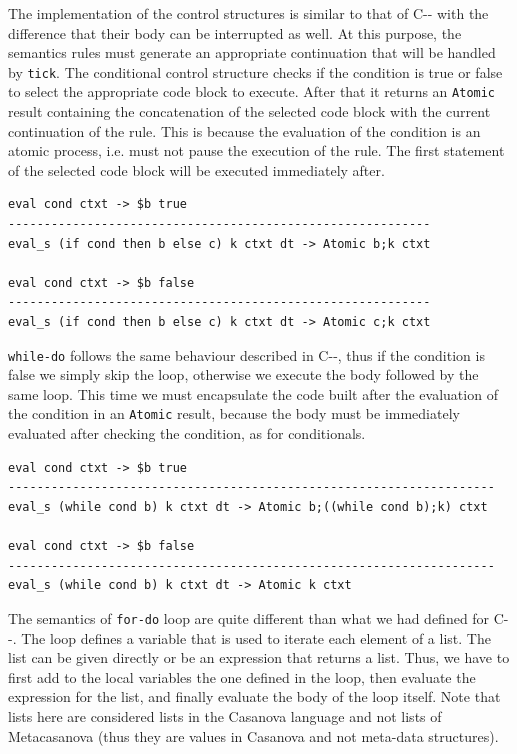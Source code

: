 The implementation of the control structures is similar to that of C-{}- with the difference that their body can be interrupted as well. At this purpose, the semantics rules must generate an appropriate continuation that will be handled by \texttt{tick}. The conditional control structure checks if the condition is true or false to select the appropriate code block to execute. After that it returns an \texttt{Atomic} result containing the concatenation of the selected code block with the current continuation of the rule. This is because the evaluation of the condition is an atomic process, i.e. must not pause the execution of the rule. The first statement of the selected code block will be executed immediately after.

\begin{lstlisting}
eval cond ctxt -> $b true
-----------------------------------------------------------
eval_s (if cond then b else c) k ctxt dt -> Atomic b;k ctxt

eval cond ctxt -> $b false
-----------------------------------------------------------
eval_s (if cond then b else c) k ctxt dt -> Atomic c;k ctxt
\end{lstlisting}

\noindent
\texttt{while-do} follows the same behaviour described in C-{}-, thus if the condition is false we simply skip the loop, otherwise we execute the body followed by the same loop. This time we must encapsulate the code built after the evaluation of the condition in an \texttt{Atomic} result, because the body must be immediately evaluated after checking the condition, as for conditionals.

\begin{lstlisting}
eval cond ctxt -> $b true
--------------------------------------------------------------------
eval_s (while cond b) k ctxt dt -> Atomic b;((while cond b);k) ctxt

eval cond ctxt -> $b false
--------------------------------------------------------------------
eval_s (while cond b) k ctxt dt -> Atomic k ctxt
\end{lstlisting}

\noindent
The semantics of \texttt{for-do} loop are quite different than what we had defined for C-{}-. The loop defines a variable that is used to iterate each element of a list. The list can be given directly or be an expression that returns a list. Thus, we have to first add to the local variables the one defined in the loop, then evaluate the expression for the list, and finally evaluate the body of the loop itself. Note that lists here are considered lists in the Casanova language and not lists of Metacasanova (thus they are values in Casanova and not meta-data structures).

